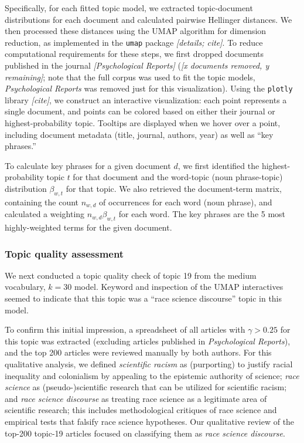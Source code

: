 \documentclass[12pt]{article}
\begin{document}
Specifically, for each fitted topic model, we extracted topic-document
distributions for each document and calculated pairwise Hellinger
distances. We then processed these distances using the UMAP algorithm
for dimension reduction, as implemented in the \texttt{umap} package
\emph{{[}details; cite{]}}. To reduce computational requirements for
these steps, we first dropped documents published in the journal
\emph{{[}Psychological Reports{]}} (\emph{{[}x documents removed, y
remaining{]}}; note that the full corpus was used to fit the topic
models, \emph{Psychological Reports} was removed just for this
visualization). Using the \texttt{plotly} library \emph{{[}cite{]}}, we
construct an interactive visualization: each point represents a single
document, and points can be colored based on either their journal or
highest-probability topic. Tooltips are displayed when we hover over a
point, including document metadata (title, journal, authors, year) as
well as ``key phrases.''

To calculate key phrases for a given document \(d\), we first identified
the highest-probability topic \(t\) for that document and the word-topic
(noun phrase-topic) distribution \(\beta_{w,t}\) for that topic. We also
retrieved the document-term matrix, containing the count \(n_{w,d}\) of
occurrences for each word (noun phrase), and calculated a weighting
\(n_{w,d} \beta_{w,t}\) for each word. The key phrases are the 5 most
highly-weighted terms for the given document.

\hypertarget{topic-quality-assessment}{%
\subsubsection*{Topic quality
assessment}\label{topic-quality-assessment}}

We next conducted a topic quality check of topic 19 from the medium
vocabulary, \(k=30\) model. Keyword and inspection of the UMAP
interactives seemed to indicate that this topic was a ``race science
discourse'' topic in this model.

To confirm this initial impression, a spreadsheet of all articles with
\(\gamma > 0.25\) for this topic was extracted (excluding articles
published in \emph{Psychological Reports}), and the top 200 articles
were reviewed manually by both authors. For this qualitative analysis,
we defined \emph{scientific racism} as (purporting) to justify racial
inequality and colonialism by appealing to the epistemic authority of
science; \emph{race science} as (pseudo-)scientific research that can be
utilized for scientific racism; and \emph{race science discourse} as
treating race science as a legitimate area of scientific research; this
includes methodological critiques of race science and empirical tests
that falsify race science hypotheses. Our qualitative review of the
top-200 topic-19 articles focused on classifying them as \emph{race
science discourse}.
\end{document}

